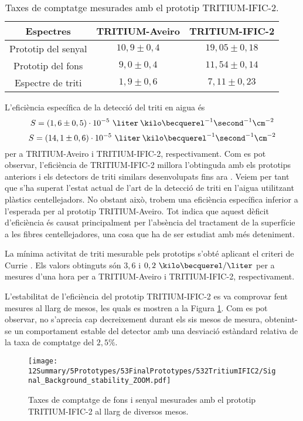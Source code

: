 \begin{table}[htbp]
\centering{}%
\begin{tabular}{ccc}
\toprule 
Espectres & TRITIUM-Aveiro & TRITIUM-IFIC-2  \tabularnewline
\midrule
\midrule 
Prototip del senyal & $10,9 \pm 0,4$ & $19,05 \pm 0,18$ \tabularnewline
Prototip del fons & $9,0 \pm 0,4$ & $11,54 \pm 0,14$ \tabularnewline  
Espectre de triti & $1,9 \pm 0,6$ & $7,11 \pm 0,23$ \tabularnewline
\bottomrule
\end{tabular}
\caption{Taxes de comptatge mesurades amb el prototip TRITIUM-IFIC-2.}
\label{tab:ContesPerSegonTRITIUMIFIC2}
\end{table}

L'eficiència específica de la detecció del triti en aigua és
$$S = (1,6 \pm 0,5)\cdot{} 10^{-5}~\liter\:\kilo\becquerel^{-1}\second^{-1}\cm^{-2}$$
$$S = (14,1 \pm 0,6)\cdot{} 10^{-5}~\liter\:\kilo\becquerel^{-1}\second^{-1}\cm^{-2}$$
per a TRITIUM-Aveiro i TRITIUM-IFIC-2, respectivament. Com es pot observar, l'eficiència de TRITIUM-IFIC-2 millora l'obtinguda amb els prototips anteriors i els detectors de triti similars desenvolupats fins ara \cite{Hofstetter1, Hofstetter2}. Veiem per tant que s'ha superat l'estat actual de l'art de la detecció de triti en l'aigua utilitzant plàstics centellejadors. No obstant això, trobem una eficiència específica inferior a l'esperada per al prototip TRITIUM-Aveiro. Tot indica que aquest dèficit d'eficiència és causat principalment per l'absència del tractament de la superfície a les fibres centellejadores, una cosa que ha de ser estudiat amb més deteniment.

La mínima activitat de triti mesurable pels prototips s'obté aplicant el criteri de Currie \cite{Knoll}. Els valors obtinguts són $3,6$ i $0,2~\kilo\becquerel/\liter$ per a mesures d'una hora per a TRITIUM-Aveiro i TRITIUM-IFIC-2, respectivament. 

L'estabilitat de l'eficiència del prototip TRITIUM-IFIC-2 es va comprovar fent mesures al llarg de mesos, les quals es mostren a la Figura \ref{fig:MonitoritzacioTRITIUMIFIC2}. Com es pot observar, no s'aprecia cap decreixement durant els sis mesos de mesura, obtenint-se un comportament estable del detector amb una desviació estàndard relativa de la taxa de comptatge del $2,5\%$.

\begin{figure}[h]
\centering
\texttt{[image: 12Summary/5Prototypes/53FinalPrototypes/532TritiumIFIC2/Signal\_Background\_stability\_ZOOM.pdf]}
\caption{Taxes de comptatge de fons i senyal mesurades amb el prototip TRITIUM-IFIC-2 al llarg de diversos mesos.\label{fig:MonitoritzacioTRITIUMIFIC2}}
\end{figure}

